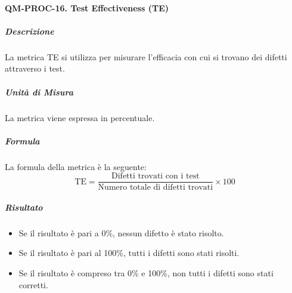 		\paragraph{QM-PROC-16. Test Effectiveness (TE)}

			\subparagraph{Descrizione}
			La metrica TE si utilizza per misurare l'efficacia con cui si trovano dei difetti attraverso i test.

			\subparagraph{Unità di Misura}
			La metrica viene espressa in percentuale.

			\subparagraph{Formula}
			La formula della metrica è la seguente:
			\[
				\text{TE} = \frac{\text{Difetti trovati con i test}}{\text{Numero totale di difetti trovati}} \times 100
			\]

			\subparagraph{Risultato}
			\begin{itemize}
				\item Se il risultato è pari a 0\%, nessun difetto è stato risolto.
				\item Se il risultato è pari al 100\%, tutti i difetti sono stati risolti.
				\item Se il risultato è compreso tra 0\% e 100\%, non tutti i difetti sono stati corretti.
			\end{itemize}


